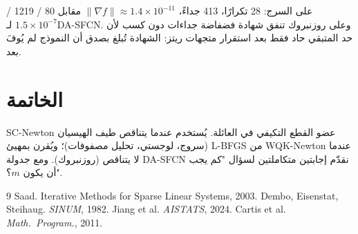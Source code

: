 ﻿\documentclass[12pt,a4paper]{article}
\begin{document}
على السرج: 28 تكرارًا، 413 جداءً، $\|\nabla f\|\approx 1.4\times 10^{-11}$
مقابل 80 / 1219 / $1.5\times 10^{-7}$ لـ\textenglish{DA-SFCN}. وعلى روزنبروك
تنفق شهادة فضفاضة جداءات دون كسب لأن حد المتبقي حاد فقط بعد استقرار متجهات
ريتز: الشهادة تُبلغ بصدق أن النموذج لم يُوفَ بعد.

\section{الخاتمة}
\textenglish{SC-Newton} عضو القطع التكيفي في العائلة. يُستخدم عندما يتناقص
طيف الهيسيان (سروج، لوجستي، تحليل مصفوفات)؛ ويُقرن بمهيئ \textenglish{L-BFGS}
من \textenglish{WQK-Newton} عندما لا يتناقص (روزنبروك). ومع جدولة
\textenglish{DA-SFCN} نقدّم إجابتين متكاملتين لسؤال "كم يجب أن يكون $m$؟".

\begin{english}
\begin{thebibliography}{9}
 Saad. Iterative Methods for Sparse Linear Systems, 2003.
 Dembo, Eisenstat, Steihaug. \textit{SINUM}, 1982.
 Jiang et al. \textit{AISTATS}, 2024.
 Cartis et al. \textit{Math.\ Program.}, 2011.
\end{thebibliography}
\end{english}
\end{document}
